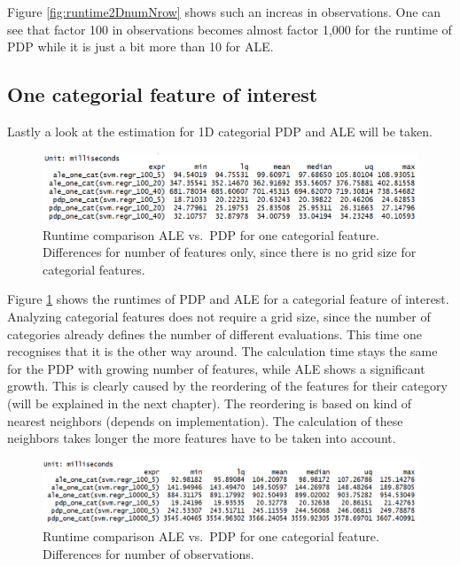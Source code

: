 \documentclass[
]{krantz}
\begin{document}
Figure \ref{fig:runtime2DnumNrow} shows such an increas in observations. One can see that factor 100 in observations becomes almost factor 1,000 for the runtime of PDP while it is just a bit more than 10 for ALE.

\hypertarget{one-categorial-feature-of-interest}{%
\subsection{One categorial feature of interest}\label{one-categorial-feature-of-interest}}

Lastly a look at the estimation for 1D categorial PDP and ALE will be taken.

\begin{figure}
\includegraphics[width=1\linewidth]{images/ale_1_one_cat_cols_and_gridsize} \caption{Runtime comparison ALE vs.~PDP for one categorial feature. Differences for number of features only, since there is no grid size for categorial features.}\label{fig:runtime1DcatColAndSize}
\end{figure}



Figure \ref{fig:runtime1DcatColAndSize} shows the runtimes of PDP and ALE for a categorial feature of interest. Analyzing categorial features does not require a grid size, since the number of categories already defines the number of different evaluations. This time one recognises that it is the other way around. The calculation time stays the same for the PDP with growing number of features, while ALE shows a significant growth. This is clearly caused by the reordering of the features for their category (will be explained in the next chapter). The reordering is based on kind of nearest neighbors (depends on implementation). The calculation of these neighbors takes longer the more features have to be taken into account.

\begin{figure}
\includegraphics[width=1\linewidth]{images/ale_1_one_cat_nrows} \caption{Runtime comparison ALE vs.~PDP for one categorial feature. Differences for number of observations.}\label{fig:runtime1DcatNrow}
\end{figure}
\end{document}
